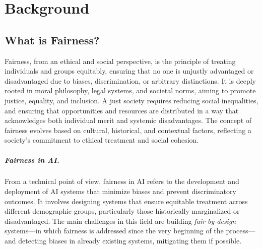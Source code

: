 \documentclass[12pt,a4paper,openright,twoside]{book}
\begin{document}
\chapter{Background}%
\label{chap:background}

\section{What is Fairness?}
%
%
Fairness, from an ethical and social perspective, is the principle of treating individuals and groups equitably, ensuring that no one is unjustly advantaged or disadvantaged due to biases, discrimination, or arbitrary distinctions.
%
It is deeply rooted in moral philosophy, legal systems, and societal norms, aiming to promote justice, equality, and inclusion.
%
A just society requires reducing social inequalities, and ensuring that opportunities and resources are distributed in a way that acknowledges both individual merit and systemic disadvantages.
%
The concept of fairness evolves based on cultural, historical, and contextual factors, reflecting a society’s commitment to ethical treatment and social cohesion.


\paragraph{Fairness in \acs{AI}.}

From a technical point of view, fairness in \ac{AI} refers to the development and deployment of \ac{AI} systems that minimize biases and prevent discriminatory outcomes.
%
It involves designing systems that ensure equitable treatment across different demographic groups, particularly those historically marginalized or disadvantaged.
\missingref
%
%
The main challenges in this field are building \textit{fair-by-design} systems---in which fairness is addressed since the very beginning of the process---and detecting biases in already existing systems, mitigating them if possible.
\missingref
%
\end{document}

